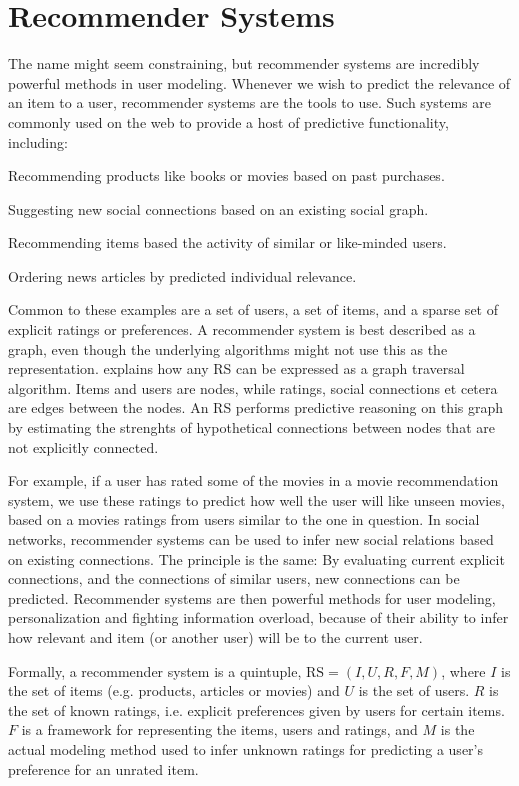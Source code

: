 \section{Recommender Systems}

The name might seem constraining, but recommender systems are incredibly powerful methods in user modeling.
Whenever we wish to predict the relevance of an item to a user, recommender systems are the tools to use.
Such systems are commonly used on the web to provide a host of predictive functionality, including:

\begin{itemize*}
  \item Recommending products like books or movies based on past purchases.
  \item Suggesting new social connections based on an existing social graph.
  \item Recommending items based the activity of similar or like-minded users.
  \item Ordering news articles by predicted individual relevance.
\end{itemize*}

Common to these examples are a set of users, a set of items, and a sparse set of explicit ratings or preferences.
A recommender system is best described as a graph, even though the underlying algorithms might not use this as the representation.
\cite{Mirza2003} explains how any RS can be expressed as a graph traversal algorithm.
Items and users are nodes, while ratings, social connections et cetera are edges between the nodes.
An RS performs predictive reasoning on this graph by estimating the strenghts of hypothetical connections between nodes that are not explicitly connected.

For example, if a user has rated some of the movies in a movie recommendation system, 
we use these ratings to predict how well the user will like unseen movies,
based on a movies ratings from users similar to the one in question.
In social networks, recommender systems can be used to infer new social relations 
based on existing connections. The principle is the same: By evaluating current explicit
connections, and the connections of similar users, new connections can be predicted.
Recommender systems are then powerful methods for user modeling, personalization and fighting information overload,
because of their ability to infer how relevant and item (or another user) will be to the current user.

Formally, a recommender system is a quintuple, $\mathrm{RS} = (I, U, R, F, M)$,
where $I$ is the set of items (e.g. products, articles or movies) and $U$ is the set of users.
$R$ is the set of known ratings, i.e. explicit preferences given by users for certain items.
$F$ is a framework for representing the items, users and ratings, and 
$M$ is the actual modeling method used to infer unknown ratings 
for predicting a user's preference for an unrated item. 

